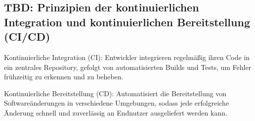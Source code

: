 \subsection{TBD: Prinzipien der kontinuierlichen Integration und kontinuierlichen Bereitstellung (CI/CD)}
Kontinuierliche Integration (CI): Entwickler integrieren regelmäßig ihren Code in ein zentrales Repository, gefolgt von automatisierten Builds und Tests, um Fehler frühzeitig zu erkennen und zu beheben.

Kontinuierliche Bereitstellung (CD): Automatisiert die Bereitstellung von Softwareänderungen in verschiedene Umgebungen, sodass jede erfolgreiche Änderung schnell und zuverlässig an Endnutzer ausgeliefert werden kann.

